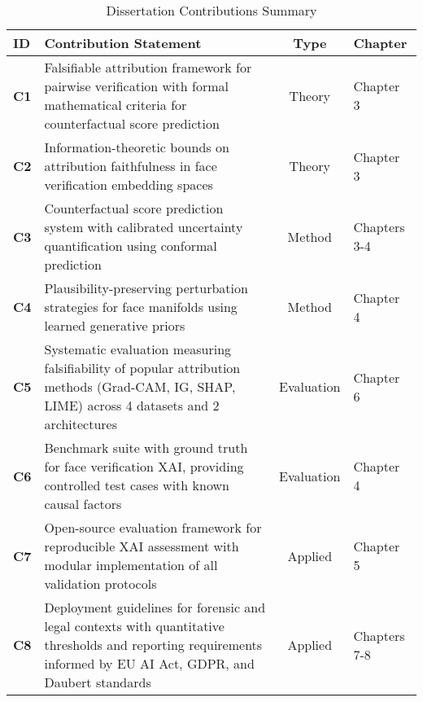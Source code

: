 
\begin{table}[htbp]
\centering
\caption{Dissertation Contributions Summary}
\label{tab:contributions}
\small
\begin{tabularx}{\textwidth}{>{\centering\arraybackslash}p{}Xcp{}}
\toprule
\textbf{ID} & \textbf{Contribution Statement} & \textbf{Type} & \textbf{Chapter} \\
\midrule
\textbf{C1} & Falsifiable attribution framework for pairwise verification with formal mathematical criteria for counterfactual score prediction & Theory & Chapter 3 \\[6pt]

\textbf{C2} & Information-theoretic bounds on attribution faithfulness in face verification embedding spaces & Theory & Chapter 3 \\[6pt]

\textbf{C3} & Counterfactual score prediction system with calibrated uncertainty quantification using conformal prediction & Method & Chapters 3-4 \\[6pt]

\textbf{C4} & Plausibility-preserving perturbation strategies for face manifolds using learned generative priors & Method & Chapter 4 \\[6pt]

\textbf{C5} & Systematic evaluation measuring falsifiability of popular attribution methods (Grad-CAM, IG, SHAP, LIME) across 4 datasets and 2 architectures & Evaluation & Chapter 6 \\[6pt]

\textbf{C6} & Benchmark suite with ground truth for face verification XAI, providing controlled test cases with known causal factors & Evaluation & Chapter 4 \\[6pt]

\textbf{C7} & Open-source evaluation framework for reproducible XAI assessment with modular implementation of all validation protocols & Applied & Chapter 5 \\[6pt]

\textbf{C8} & Deployment guidelines for forensic and legal contexts with quantitative thresholds and reporting requirements informed by EU AI Act, GDPR, and Daubert standards & Applied & Chapters 7-8 \\
\bottomrule
\end{tabularx}
\end{table}

